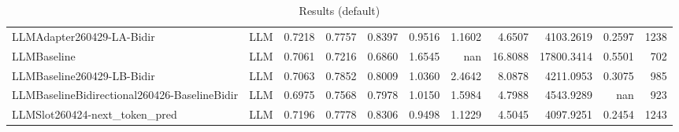 \begin{table}[htbp]
{\begin{tabular}{ll|rrrrrrrr|r}
LLMAdapter260429-LA-Bidir & LLM & 0.7218 & 0.7757 & 0.8397 & 0.9516 & 1.1602 & 4.6507 & 4103.2619 & 0.2597 & 1238 \\
LLMBaseline & LLM & 0.7061 & 0.7216 & 0.6860 & 1.6545 & nan & 16.8088 & 17800.3414 & 0.5501 & 702 \\
LLMBaseline260429-LB-Bidir & LLM & 0.7063 & 0.7852 & 0.8009 & 1.0360 & 2.4642 & 8.0878 & 4211.0953 & 0.3075 & 985 \\
LLMBaselineBidirectional260426-BaselineBidir & LLM & 0.6975 & 0.7568 & 0.7978 & 1.0150 & 1.5984 & 4.7988 & 4543.9289 & nan & 923 \\
LLMSlot260424-next\_token\_pred & LLM & 0.7196 & 0.7778 & 0.8306 & 0.9498 & 1.1229 & 4.5045 & 4097.9251 & 0.2454 & 1243 \\
\bottomrule
\end{tabular}
}
\caption{Results (default)}
\label{tab:results_default}
\end{table}